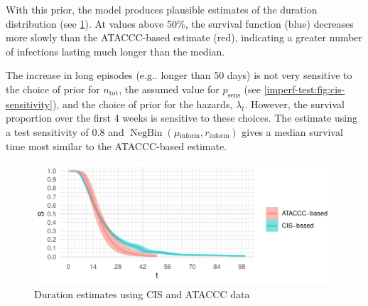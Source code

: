 \documentclass[referee,useAMS,usenatbib]{biom}
\makeatletter
\DeclareMathOperator{\NBr}{NegBin}
\newcommand{\NBc}{\NBr}
\newcommand{\psens}{p_\text{sens}}
\newcommand{\ntot}{n_\text{tot}}
\newcommand{\inform}{{_{\text{inform}}}}
\DeclareRobustCommand\onedot{\futurelet\@let@token\@onedot}
\def\@onedot{\ifx\@let@token.\else.\null\fi\xspace}
\def\eg{e.g\onedot} \def\Eg{{E.g}\onedot}
\makeatother
\begin{document}
With this prior, the model produces plausible estimates of the duration distribution (see \cref{imperf-test:fig:cis-estimates}).
At values above 50\%, the survival function (blue) decreases more slowly than the ATACCC-based estimate (red), indicating a greater number of infections lasting much longer than the median.

The increase in long episodes (\eg longer than 50 days) is not very sensitive to the choice of prior for $\ntot$, the assumed value for $\psens$ (see \cref{imperf-test:fig:cis-sensitivity}), and the choice of prior for the hazards, $\lambda_t$.
However, the survival proportion over the first 4 weeks is sensitive to these choices.
The estimate using a test sensitivity of 0.8 and $\NBc(\mu\inform, r\inform)$ gives a median survival time most similar to the ATACCC-based estimate.
\begin{figure}
  \includegraphics{figures/output/CIS_final}
  \caption{Duration estimates using CIS and ATACCC data}
  \label{imperf-test:fig:cis-estimates}
\end{figure}
\end{document}
